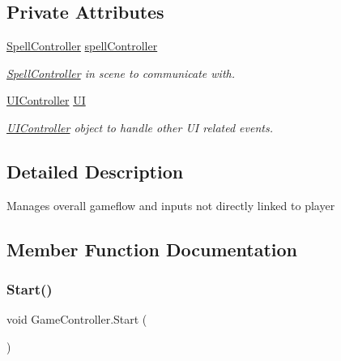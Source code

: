 \subsection*{Private Attributes}
\begin{DoxyCompactItemize}
\item 
\mbox{\label{class_game_controller_a3de58fb8ba542b1777de9f3bd9bb0977}} 
\hyperlink{class_spell_controller}{Spell\+Controller} \hyperlink{class_game_controller_a3de58fb8ba542b1777de9f3bd9bb0977}{spell\+Controller}
\begin{DoxyCompactList}\small\item\em \hyperlink{class_spell_controller}{Spell\+Controller} in scene to communicate with. \end{DoxyCompactList}\item 
\mbox{\label{class_game_controller_a2b44559411b7d7d6b52481b7f7b75852}} 
\hyperlink{class_u_i_controller}{U\+I\+Controller} \hyperlink{class_game_controller_a2b44559411b7d7d6b52481b7f7b75852}{UI}
\begin{DoxyCompactList}\small\item\em \hyperlink{class_u_i_controller}{U\+I\+Controller} object to handle other UI related events. \end{DoxyCompactList}\end{DoxyCompactItemize}


\subsection{Detailed Description}
Manages overall gameflow and inputs not directly linked to player 

\subsection{Member Function Documentation}
\mbox{\label{class_game_controller_a97788a7aa0f09c8d748781683e5f045b}} 
\subsubsection{\texorpdfstring{Start()}{Start()}}
{\footnotesize\ttfamily void Game\+Controller.\+Start (\begin{DoxyParamCaption}{ }\end{DoxyParamCaption})\hspace{0.3cm}{\ttfamily [private]}}

